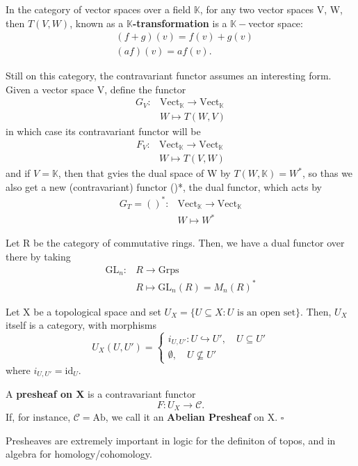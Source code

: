 \documentclass[../category_theory.tex]{subfiles}
\begin{document}
\begin{example}
	In the category of vector spaces over a field \(\mathbb{K}\), for any two vector spaces V, W, then \(T(V, W)\), known as a \(\mathbb{K}\)\textbf{-transformation} is a \(\mathbb{K}-\)vector space:
	\begin{align*}
		 & (f+g)(v)=f(v)+g(v) \\
		 & (af)(v)=af(v).
	\end{align*}

	Still on this category, the contravariant functor assumes an interesting form. Given a vector space V, define the functor
	\begin{align*}
		G_{V}: & \mathrm{Vect}_{\mathbb{K}}\rightarrow \mathrm{Vect}_{\mathbb{K}} \\
		       & W\mapsto T(W, V)
	\end{align*}
	in which case its contravariant functor will be
	\begin{align*}
		F_{V}: & \mathrm{Vect}_{\mathbb{K}}\rightarrow \mathrm{Vect}_{\mathbb{K}} \\
		       & W \mapsto T(V, W)
	\end{align*}
	and if \(V=\mathbb{K}\), then that gvies the dual space of W by \(T(W, \mathbb{K})=W^{*}\), so thas we also get a new (contravariant) functor ()*, the dual functor, which acts by
	\begin{align*}
		G_{T}=()^{*}: & \mathrm{Vect}_{\mathbb{K}}\rightarrow \mathrm{Vect}_{\mathbb{K}} \\
		              & W\mapsto W^{*}
	\end{align*}
\end{example}
\begin{example}
	Let R be the category of commutative rings. Then, we have a dual functor over there by taking
	\begin{align*}
		\mathrm{GL}_{n}: & R\rightarrow \mathrm{Grps}               \\
		                 & R\mapsto \mathrm{GL}_{n}(R)=M_{n}(R)^{*}
	\end{align*}
\end{example}
\begin{example}
	Let X be a topological space and set \(U_{X}=\{U\subseteq X: U \text{ is an open set}\}\). Then, \(U_{X}\) itself is a category, with morphisms
	\[
		U_{X}(U, U') = \left\{\begin{array}{ll}
			i_{U, U'}:U\hookrightarrow U',\quad U\subseteq U' \\
			\emptyset , \quad U\not\subseteq U'
		\end{array}\right.
	\]
	where \(i_{U, U'}=\mathrm{id}_{U}\).
\end{example}
\begin{def*}
	A \textbf{presheaf on X} is a contravariant functor
	\[
		F:U_{X}\rightarrow \mathcal{C}.
	\]
	If, for instance, \(\mathcal{C}=\mathrm{Ab}\), we call it an \textbf{Abelian Presheaf} on X. \(\square\)
\end{def*}
Presheaves are extremely important in logic for the definiton of topos, and in algebra for homology/cohomology.
\end{document}

